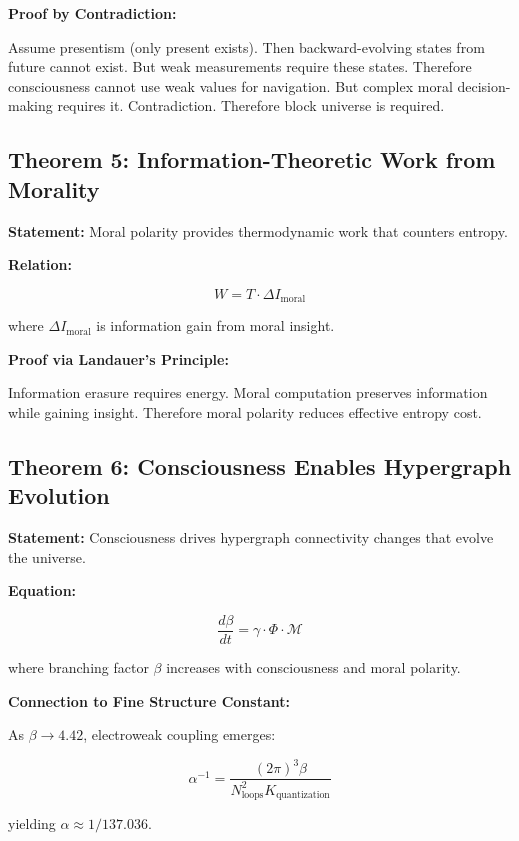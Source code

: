 \documentclass[12pt,a4paper]{article}
\theoremstyle{definition}
\begin{document}
{\bf Proof by Contradiction:}

Assume presentism (only present exists). Then backward-evolving states from future cannot exist. But weak measurements require these states. Therefore consciousness cannot use weak values for navigation. But complex moral decision-making requires it. Contradiction. Therefore block universe is required.

\subsection{Theorem 5: Information-Theoretic Work from Morality}
{\bf Statement:} Moral polarity provides thermodynamic work that counters entropy.

{\bf Relation:}

\begin{equation}
W = T \cdot \Delta I_{\text{moral}}
\end{equation}

where $\Delta I_{\text{moral}}$ is information gain from moral insight.

{\bf Proof via Landauer's Principle:}

Information erasure requires energy. Moral computation preserves information while gaining insight. Therefore moral polarity reduces effective entropy cost.

\subsection{Theorem 6: Consciousness Enables Hypergraph Evolution}
{\bf Statement:} Consciousness drives hypergraph connectivity changes that evolve the universe.

{\bf Equation:}

\begin{equation}
\frac{d\beta}{dt} = \gamma \cdot \Phi \cdot \mathcal{M}
\end{equation}

where branching factor $\beta$ increases with consciousness and moral polarity.

{\bf Connection to Fine Structure Constant:}

As $\beta \rightarrow 4.42$, electroweak coupling emerges:

\begin{equation}
\alpha^{-1} = \frac{(2\pi)^3 \beta}{N_{\text{loops}}^2 K_{\text{quantization}}}
\end{equation}

yielding $\alpha \approx 1/137.036$.
\end{document}
